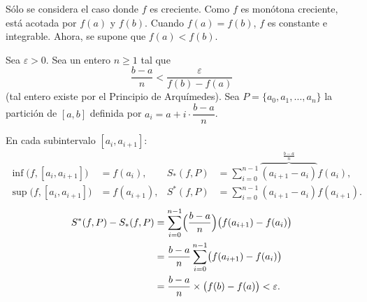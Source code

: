 \documentclass[11pt,a4paper]{article}
\begin{document}
\begin{demo}
Sólo se considera el caso donde $f$ es creciente.
Como $f$ es monótona creciente, está acotada por $f(a)$ y $f(b)$.
Cuando $f(a)=f(b)$, $f$ es constante e integrable.
Ahora, se supone que $f(a)<f(b)$.

Sea $\varepsilon>0$. Sea un entero $n\ge1$ tal que
\[
  \frac{b-a}{n}<\frac{\varepsilon}{f(b)-f(a)}
\]
(tal entero existe por el Principio de Arquímedes).
Sea $P=\{a_0,a_1,\dots,a_n\}$ la partición de $[a,b]$ definida por $a_i=a+i\cdot\dfrac{b-a}{n}$.

\begin{center}
\end{center}

En cada subintervalo $[a_i,a_{i+1}]$:
\begin{align*}
  \inf\bigl(f,[a_i,a_{i+1}]\bigr)&=f(a_i), & S_*(f,P)&=\sum_{i=0}^{n-1}\overbrace{(a_{i+1}-a_i)}^{\frac{b-a}{n}}f(a_i),\\
  \sup\bigl(f,[a_i,a_{i+1}]\bigr)&=f(a_{i+1}), & S^*(f,P)&=\sum_{i=0}^{n-1}(a_{i+1}-a_i)f(a_{i+1}).
\end{align*}
\begin{align*}
  S^*(f,P)-S_*(f,P)&=\sum_{i=0}^{n-1}\Bigl(\frac{b-a}{n}\Bigr)\bigl(f(a_{i+1})-f(a_i)\bigr)\\
  &=\frac{b-a}{n}\sum_{i=0}^{n-1}\bigl(f(a_{i+1})-f(a_i)\bigr)\\
  &=\frac{b-a}{n}\times\bigl(f(b)-f(a)\bigr)<\varepsilon.
\end{align*}
\end{demo}
\end{document}
